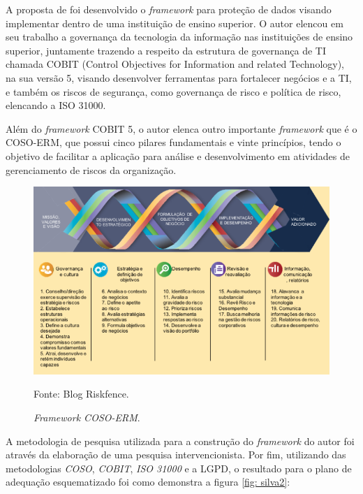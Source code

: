 \documentclass[
	12pt,				%
	openright,			%
	oneside,			%
	a4paper,			%
	english,			%
	french,				%
	spanish,			%
	brazil,				%
	]{abntex2}
\begin{document}

A proposta de  foi desenvolvido o \textit{framework} para proteção de dados visando implementar dentro de uma instituição de ensino superior. O autor elencou em seu trabalho a governança da tecnologia da informação nas instituições de ensino superior, juntamente trazendo a respeito da estrutura de governança de TI chamada COBIT (Control Objectives for Information and related Technology), na sua versão 5, visando desenvolver ferramentas para fortalecer negócios e a TI, e também os riscos de segurança, como governança de risco e política de risco, elencando a ISO 31000.

Além do \textit{framework}  COBIT 5, o autor elenca outro importante \textit{framework}  que é o COSO-ERM, que possui cinco pilares fundamentais e vinte princípios, tendo o objetivo de facilitar a aplicação para análise e desenvolvimento em atividades de gerenciamento de riscos da organização.

\begin{figure}[ht]
    \centering
    \caption{\textit{Framework COSO-ERM}.}
    \includegraphics[width=6.8in]{Images/12Silva2020.png}
    \label{fig: 12Silva}
    
    \centering \small Fonte: Blog Riskfence.
\end{figure}

\pagebreak

A metodologia de pesquisa utilizada para a construção do \textit{framework} do autor foi através da elaboração de uma pesquisa intervencionista. Por fim, utilizando das metodologias \textit{COSO}, \textit{COBIT}, \textit{ISO 31000} e a LGPD, o resultado para o plano de adequação esquematizado foi como demonstra a figura \ref{fig: silva2}: 
\end{document}
